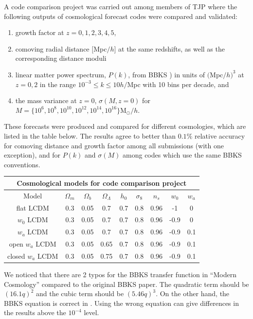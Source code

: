 \documentclass[\docopts]{\docclass}
\begin{document}
A code comparison project was carried out among members of TJP where the following outputs of cosmological forecast codes were compared and validated:
\begin{enumerate}
\item growth factor at $z = 0,1,2,3,4,5$,
\item comoving radial distance $[$Mpc$/h]$ at the same redshifts, as well as the corresponding distance moduli
\item linear matter power spectrum, $P(k)$, from BBKS \citealt{BBKS}) in units of $($Mpc$/h)^3$ at $z=0,2$ in the range $10^{-3} \leq k \leq 10 h/$Mpc with 10 bins per decade, and
\item the mass variance at $z=0$, $\sigma(M,z=0)$ for $M =\{10^6, 10^8, 10^{10}, 10^{12}, 10^{14}, 10^{16}\} $M$_\odot/h$.
\end{enumerate}
These forecasts were produced and compared for different cosmologies, which are listed in the table below. The results agree to better than $0.1\%$ relative accuracy for comoving distance and growth factor among all submissions (with one exception), and for $P(k)$ and $\sigma(M)$ among codes which use the same BBKS conventions.

\begin{center}
  \begin{tabular}{ c | c c c c c c c c }
    \hline
    \multicolumn{9}{|c|}{Cosmological models for code comparison project} \\
    \hline
    \hline
    Model & $\Omega_m$ & $\Omega_b$ & $\Omega_\Lambda$ & $h_0$ & $\sigma_8$ & $n_s$ & $w_0$ & $w_a$ \\
    \hline
    flat LCDM & 0.3 & 0.05 & 0.7 & 0.7 & 0.8 & 0.96 & -1 & 0 \\
    $w_0$ LCDM & 0.3 & 0.05 & 0.7 & 0.7 & 0.8 & 0.96 & -0.9 & 0  \\
    $w_a$ LCDM & 0.3 & 0.05 & 0.7 & 0.7 & 0.8 & 0.96 & -0.9 & 0.1  \\
    open $w_a$ LCDM & 0.3 & 0.05 & 0.65 & 0.7 & 0.8 & 0.96 & -0.9 & 0.1  \\
    closed $w_a$ LCDM & 0.3 & 0.05 & 0.75 & 0.7 & 0.8 & 0.96 & -0.9 & 0.1  \\
    \hline
  \end{tabular}
\end{center}

We noticed that there are 2 typos for the BBKS transfer function in ``Modern Cosmology'' \citep{DodelsonBook} compared to the original BBKS paper. The quadratic term should be $(16.1q)^2$ and the cubic term should be $(5.46q)^3$. On the other hand, the BBKS equation is correct in \citet{PeacockBook}. Using the wrong equation can give differences in the results above the $10^{-4}$ level.
\end{document}
